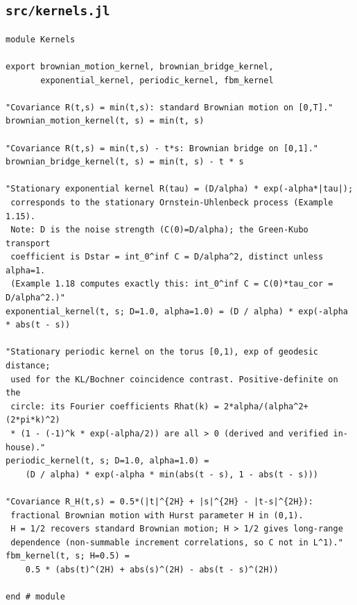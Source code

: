 \documentclass[11pt]{article}
\begin{document}
\subsection*{\texttt{src/kernels.jl}}
\begin{lstlisting}
module Kernels

export brownian_motion_kernel, brownian_bridge_kernel,
       exponential_kernel, periodic_kernel, fbm_kernel

"Covariance R(t,s) = min(t,s): standard Brownian motion on [0,T]."
brownian_motion_kernel(t, s) = min(t, s)

"Covariance R(t,s) = min(t,s) - t*s: Brownian bridge on [0,1]."
brownian_bridge_kernel(t, s) = min(t, s) - t * s

"Stationary exponential kernel R(tau) = (D/alpha) * exp(-alpha*|tau|);
 corresponds to the stationary Ornstein-Uhlenbeck process (Example 1.15).
 Note: D is the noise strength (C(0)=D/alpha); the Green-Kubo transport
 coefficient is Dstar = int_0^inf C = D/alpha^2, distinct unless alpha=1.
 (Example 1.18 computes exactly this: int_0^inf C = C(0)*tau_cor = D/alpha^2.)"
exponential_kernel(t, s; D=1.0, alpha=1.0) = (D / alpha) * exp(-alpha * abs(t - s))

"Stationary periodic kernel on the torus [0,1), exp of geodesic distance;
 used for the KL/Bochner coincidence contrast. Positive-definite on the
 circle: its Fourier coefficients Rhat(k) = 2*alpha/(alpha^2+(2*pi*k)^2)
 * (1 - (-1)^k * exp(-alpha/2)) are all > 0 (derived and verified in-house)."
periodic_kernel(t, s; D=1.0, alpha=1.0) =
    (D / alpha) * exp(-alpha * min(abs(t - s), 1 - abs(t - s)))

"Covariance R_H(t,s) = 0.5*(|t|^{2H} + |s|^{2H} - |t-s|^{2H}):
 fractional Brownian motion with Hurst parameter H in (0,1).
 H = 1/2 recovers standard Brownian motion; H > 1/2 gives long-range
 dependence (non-summable increment correlations, so C not in L^1)."
fbm_kernel(t, s; H=0.5) =
    0.5 * (abs(t)^(2H) + abs(s)^(2H) - abs(t - s)^(2H))

end # module
\end{lstlisting}
\end{document}
